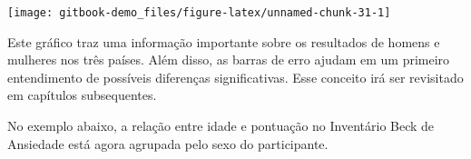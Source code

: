 \documentclass[
]{book}
\newenvironment{Shaded}{\begin{snugshade}}{\end{snugshade}}
\newcommand{\DataTypeTok}[1]{\textcolor[rgb]{0.13,0.29,0.53}{#1}}
\newcommand{\FloatTok}[1]{\textcolor[rgb]{0.00,0.00,0.81}{#1}}
\newcommand{\KeywordTok}[1]{\textcolor[rgb]{0.13,0.29,0.53}{\textbf{#1}}}
\newcommand{\NormalTok}[1]{#1}
\newcommand{\OperatorTok}[1]{\textcolor[rgb]{0.81,0.36,0.00}{\textbf{#1}}}
\newcommand{\StringTok}[1]{\textcolor[rgb]{0.31,0.60,0.02}{#1}}
\begin{document}
\begin{Shaded}
\end{Shaded}

\begin{center}\texttt{[image: gitbook-demo\_files/figure-latex/unnamed-chunk-31-1]} \end{center}

Este gráfico traz uma informação importante sobre os resultados de homens e mulheres nos três países. Além disso, as barras de erro ajudam em um primeiro entendimento de possíveis diferenças significativas. Esse conceito irá ser revisitado em capítulos subsequentes.

No exemplo abaixo, a relação entre idade e pontuação no Inventário Beck de Ansiedade está agora agrupada pelo sexo do participante.

\begin{Shaded}
\end{Shaded}
\end{document}
